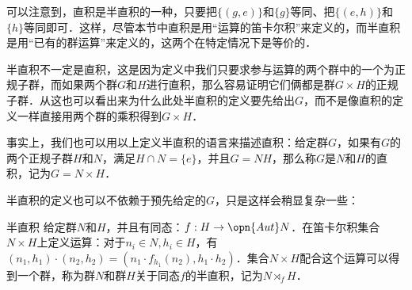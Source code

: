 可以注意到，直积是半直积的一种，只要把$\{(g, e)\}$和$\{g\}$等同、把$\{(e, h)\}$和$\{h\}$等同即可．这样，尽管本节中直积是用“运算的笛卡尔积”来定义的，而半直积是用“已有的群运算”来定义的，这两个在特定情况下是等价的．

半直积不一定是直积，这是因为定义中我们只要求参与运算的两个群中的一个为正规子群，而如果两个群$G$和$H$进行直积，那么容易证明它们俩都是群$G\times H$的正规子群．从这也可以看出来为什么此处半直积的定义要先给出$G$，而不是像直积的定义一样直接用两个群的乘积得到$G\times H$．

事实上，我们也可以用以上定义半直积的语言来描述直积：给定群$G$，如果有$G$的两个正规子群$H$和$N$，满足$H\cap N=\{e\}$，并且$G=NH$，那么称$G$是$N$和$H$的直积，记为$G=N\times H$．

半直积的定义也可以不依赖于预先给定的$G$，只是这样会稍显复杂一些：

\begin{definition}{半直积}
给定群$N$和$H$，并且有同态：$f:H\rightarrow \opn{Aut}N$．在笛卡尔积集合$N\times H$上定义运算：对于$n_i\in N, h_i\in H$，有$(n_1, h_1)\cdot(n_2, h_2)=(n_1\cdot f_{h_1}(n_2), h_1\cdot h_2)$．集合$N\times H$配合这个运算可以得到一个群，称为群$N$和群$H$关于同态$f$的半直积，记为$N\rtimes_fH$．
\end{definition}














